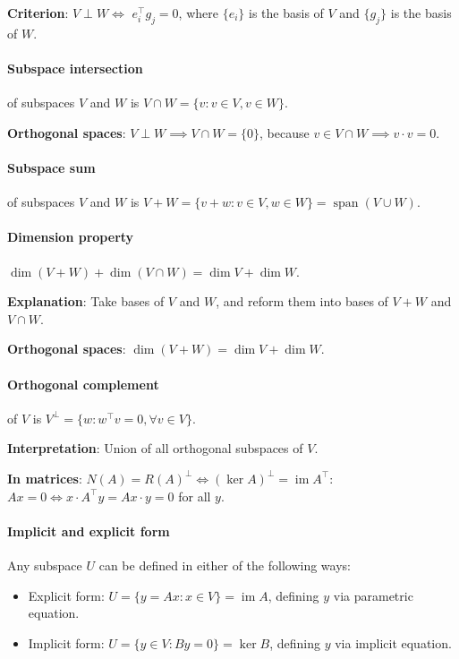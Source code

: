 \documentclass{article}
\begin{document}
\textbf{Criterion}: $V \perp W \iff$ $e_i^\top g_j = 0$, where $\{e_i\}$ is the basis of $V$ and $\{g_j\}$ is the basis of $W$.

\paragraph{Subspace intersection} of subspaces $V$ and $W$ is $V \cap W = \{v : v \in V, v \in W\}$.

\textbf{Orthogonal spaces}: $V \perp W \implies V \cap W = \{0\}$, because $v \in V \cap W \implies v \cdot v = 0$.

\paragraph{Subspace sum} of subspaces $V$ and $W$ is $V + W = \{v + w : v \in V, w \in W\} = \operatorname{span}(V \cup W)$.

\paragraph{Dimension property} $\dim(V+W) + \dim(V \cap W) = \dim V + \dim W$.

\textbf{Explanation}: Take bases of $V$ and $W$, and reform them into bases of $V+W$ and $V \cap W$.

\textbf{Orthogonal spaces}: $\dim (V+W) = \dim V + \dim W$.

\paragraph{Orthogonal complement} of $V$ is $V^\perp = \{w : w^\top v = 0,  \forall v \in V \}$.

\textbf{Interpretation}: Union of all orthogonal subspaces of $V$.

\textbf{In matrices}: $N(A) = R(A)^\perp \iff (\ker A)^\perp = \operatorname{im} A^\top$: $Ax = 0 \iff x \cdot A^\top y = Ax \cdot y = 0$ for all $y$.


\paragraph{Implicit and explicit form} Any subspace $U$ can be defined in either of the following ways:

\begin{itemize}
    \item Explicit form: $U = \{y = Ax : x \in V\} = \operatorname{im} A$, defining $y$ via parametric equation.
    \item Implicit form: $U = \{y \in V : By = 0\} = \ker B$, defining $y$ via implicit equation.
\end{itemize}
\end{document}

